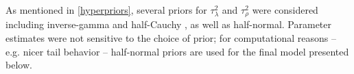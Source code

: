 As mentioned in \ref{hyperpriors}, several priors for $\tau^2_\lambda$ and $\tau^2_\rho$ were considered including inverse-gamma  and half-Cauchy , as well as half-normal. Parameter estimates were not sensitive to the choice of prior; for computational reasons -- e.g. nicer tail behavior -- half-normal priors are used for the final model presented below.

%
%
